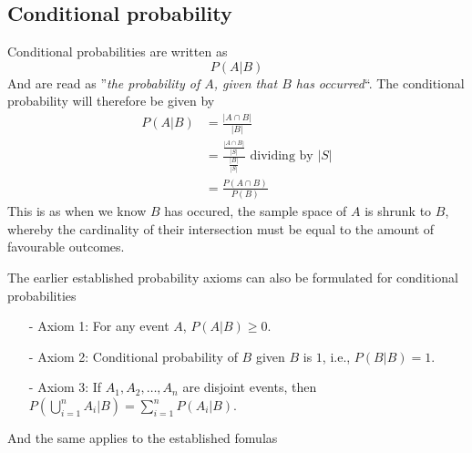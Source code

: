 \subsection{Conditional probability}
Conditional probabilities are written as
\[
    P(A|B)
\]
And are read as ''\textit{the probability of $A$, given that $B$ has occurred}``. The conditional probability will therefore be given by
\begin{align*}
    P(A|B)&=\frac{|A\cap B|}{|B|} \\
            &=\frac{\frac{|A\cap B|}{|S|}}{\frac{|B|}{|S|}} \text{ dividing by $|S|$} \\
            &=\frac{P(A\cap B)}{P(B)}
\end{align*}
This is as when we know $B$ has occured, the sample space of $A$ is shrunk to $B$, whereby the cardinality of their intersection must be equal to the amount of favourable outcomes.

The earlier established probability axioms can also be formulated for conditional probabilities
\begin{itemize}
    \item[-] Axiom 1: For any event $A$, $P(A|B)\geq 0$.
    \item[-] Axiom 2: Conditional probability of $B$ given $B$ is $1$, i.e., $P(B|B)=1$.
    \item[-] Axiom 3: If $A_{1},A_{2},\ldots,A_{n}$ are disjoint events, then $P(\bigcup_{i=1}^{n}A_{i}|B)=\sum_{i=1}^{n} P(A_{i}|B)$.
\end{itemize}
And the same applies to the established fomulas

